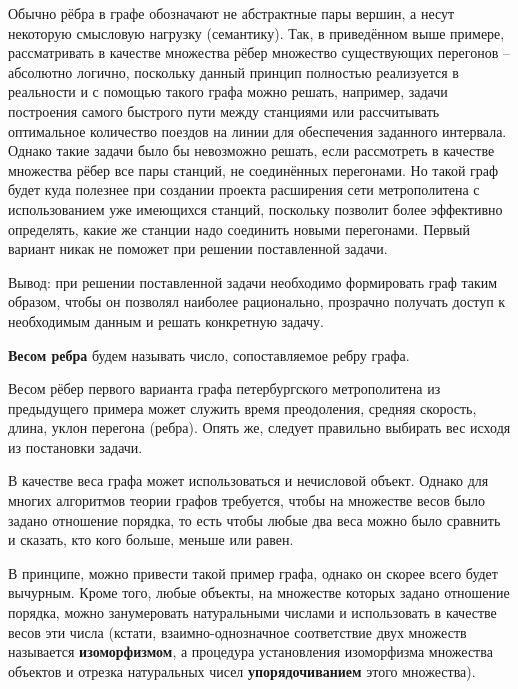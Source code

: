\begin{remark}
	Обычно рёбра в графе обозначают не абстрактные пары вершин, а несут некоторую смысловую нагрузку (семантику). Так, в приведённом выше примере, рассматривать в качестве множества рёбер множество существующих перегонов -- абсолютно логично, поскольку данный принцип полностью реализуется в реальности и с помощью такого графа можно решать, например, задачи построения самого быстрого пути между станциями или рассчитывать оптимальное количество поездов на линии для обеспечения заданного интервала. Однако такие задачи было бы невозможно решать, если рассмотреть в качестве множества рёбер все пары станций, не соединённых перегонами. Но такой граф будет куда полезнее при создании проекта расширения сети метрополитена с использованием уже имеющихся станций, поскольку позволит более эффективно определять, какие же станции надо соединить новыми перегонами. Первый вариант никак не поможет при решении поставленной задачи.
	
	Вывод: при решении поставленной задачи необходимо формировать граф таким образом, чтобы он позволял наиболее рационально, прозрачно получать доступ к необходимым данным и решать конкретную задачу.
\end{remark}

\begin{definition}
	\textbf{Весом ребра} будем называть число, сопоставляемое ребру графа.
\end{definition}
\begin{example}
	Весом рёбер первого варианта графа петербургского метрополитена из предыдущего примера может служить время преодоления, средняя скорость, длина, уклон перегона (ребра). Опять же, следует правильно выбирать вес исходя из постановки задачи.
\end{example}
\begin{remark}
	В качестве веса графа может использоваться и нечисловой объект. Однако для многих алгоритмов теории графов требуется, чтобы на множестве весов было задано отношение порядка, то есть чтобы любые два веса можно было сравнить и сказать, кто кого больше, меньше или равен.
	
	В принципе, можно привести такой пример графа, однако он скорее всего будет вычурным. Кроме того, любые объекты, на множестве которых задано отношение порядка, можно занумеровать натуральными числами и использовать в качестве весов эти числа (кстати, взаимно-однозначное соответствие двух множеств называется \textbf{изоморфизмом}, а процедура установления изоморфизма множества объектов и отрезка натуральных чисел \textbf{упорядочиванием} этого множества).
\end{remark}

